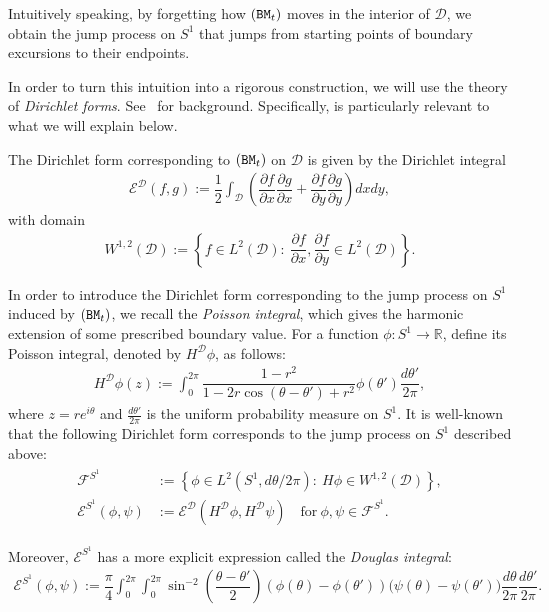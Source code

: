 \documentclass[10pt]{amsart}
\theoremstyle{definition}\newtheorem{defi}[theo]{Definition}\newtheorem{rema}[theo]{Remark}\newtheorem{exam}[theo]{Example}\newtheorem{exem}[theo]{Example}\newtheorem{nota}[theo]{Notation}
\newcommand{\ce}{\mathcal{E}}
\newcommand{\cf}{\mathcal{F}}
\newcommand{\cd}{\mathcal{D}}
\newcommand{\br}{\mathbb{R}}
\begin{document}
Intuitively speaking, by forgetting how $({\tt BM}_t)$ moves in the interior of $\cd$, we obtain the jump process on $S^1$ that jumps from starting points of boundary excursions to their endpoints.

In order to turn this intuition into a rigorous construction, we will use the theory of \emph{Dirichlet forms}. See~\cite{CF,FOT} for background. Specifically, \cite[Example~1.2.3]{FOT} is particularly relevant to what we will explain below.

The Dirichlet form corresponding to $({\tt BM}_t)$ on $\cd$ is given by the Dirichlet integral
\begin{align*}
\ce^\cd(f,g):=\dfrac{1}{2}\int_\cd\left(\dfrac{\partial f}{\partial x}\dfrac{\partial g}{\partial x}+\dfrac{\partial f}{\partial y}\dfrac{\partial g}{\partial y}\right)dxdy,
\end{align*}
with domain
\begin{align*}
W^{1,2}(\cd):=\left\{f\in L^2(\cd):\ \dfrac{\partial f}{\partial x},\dfrac{\partial f}{\partial y}\in L^2(\cd)\right\}.
\end{align*}

In order to introduce the Dirichlet form corresponding to the jump process on $S^1$ induced by $({\tt BM}_t)$, we recall the \emph{Poisson integral}, which gives the harmonic extension of some prescribed boundary value. For a function $\phi:S^1\to\br$, define its Poisson integral, denoted by $H^\cd\phi$, as follows:
\begin{align}\label{poisson int}
H^\cd\phi(z):=\int_0^{2\pi}\dfrac{1-r^2}{1-2r\cos(\theta-\theta')+r^2}\phi(\theta')\dfrac{d\theta'}{2\pi},
\end{align}
where $z=re^{i\theta}$ and $\frac{d\theta'}{2\pi}$ is the uniform probability measure on $S^1$. It is well-known that the following Dirichlet form corresponds to the jump process on $S^1$ described above:
\begin{align}\label{circle}
\begin{split}
\cf^{S^1}&:=\left\{\phi\in L^2\left(S^1, d\theta/2\pi\right):\ H\phi\in W^{1,2}(\cd)\right\},\\
\ce^{S^1}(\phi,\psi)&:=\ce^\cd\left(H^\cd\phi,H^\cd\psi\right)\quad \text{for}\ \phi,\psi\in\cf^{S^1}.
\end{split}
\end{align}

Moreover, $\ce^{S^1}$ has a more explicit expression called the \emph{Douglas integral}:
\begin{align}\label{douglas}
\ce^{S^1}(\phi,\psi):=\dfrac{\pi}{4}\int_0^{2\pi}\int_0^{2\pi}\sin^{-2}\left(\dfrac{\theta-\theta'}{2}\right)(\phi(\theta)-\phi(\theta'))\big(\psi(\theta)-\psi(\theta')\big)\dfrac{d\theta}{2\pi}\dfrac{d\theta'}{2\pi}.
\end{align}
\end{document}
